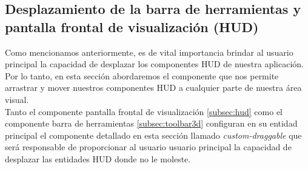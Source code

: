 \documentclass[a4paper, 11pt]{book}
\begin{document}
\subsection{Desplazamiento de la barra de herramientas y pantalla frontal de visualización (HUD)}
\label{subsec:customDraggable}
Como mencionamos anteriormente, es de vital importancia brindar al usuario principal la capacidad de desplazar los componentes \textsc{HUD} de nuestra aplicación. Por lo tanto, en esta sección abordaremos el componente que nos permite arrastrar y mover nuestros componentes \textsc{HUD} a cualquier parte de nuestra área visual.\\
Tanto el componente pantalla frontal de visualización \ref{subsec:hud} como el componente barra de herramientas \ref{subsec:toolbar3d} configuran en su entidad principal el componente detallado en esta sección llamado \emph{custom-draggable} que será responsable de proporcionar al usuario usuario principal la capacidad de desplazar las entidades \textsc{HUD} donde no le moleste.
\end{document}
